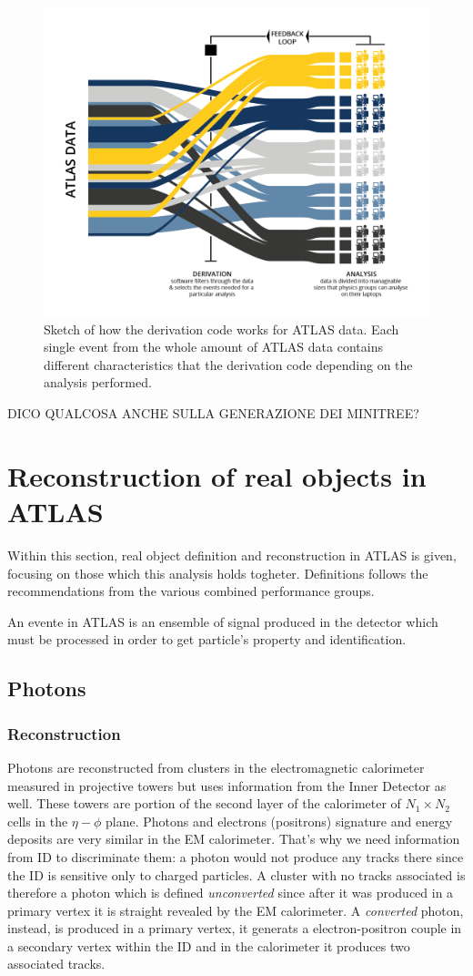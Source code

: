 \begin{figure}[tp]
\centering
\includegraphics[width=.7\textwidth]{MCSample/Derivation}
\caption{Sketch of how the derivation code works for ATLAS data. Each single event from the whole amount of ATLAS data contains different characteristics that the derivation code depending on the analysis performed.}
\label{fig:derivation}
\end{figure}

DICO QUALCOSA ANCHE SULLA GENERAZIONE DEI MINITREE?

\section{Reconstruction of real objects in ATLAS}
Within this section, real object definition and reconstruction in ATLAS is given, focusing on those which this analysis holds togheter. Definitions follows the recommendations from the various combined performance groups. 

An evente in ATLAS is an ensemble of signal produced in the detector which must be processed in order to get particle's property and identification. 

\subsection{Photons}
\label{photons}
\subsubsection{Reconstruction}
Photons are reconstructed from clusters in the electromagnetic calorimeter measured in projective towers but uses information from the Inner Detector as well. These towers are portion of the second layer of the calorimeter of $N_1 \times N_2$ cells in the $\eta-\phi$ plane. Photons and electrons (positrons) signature and energy deposits are very similar in the EM calorimeter. That's why we need information from ID to discriminate them: a photon would not produce any tracks there since the ID is sensitive only to charged particles. A cluster with no tracks associated is therefore a photon which is defined \emph{unconverted} since after it was produced in a primary vertex it is straight revealed by the EM calorimeter. A \emph{converted} photon, instead, is produced in a primary vertex, it generats a electron-positron couple in a secondary vertex within the ID and in the calorimeter it produces two associated tracks.

